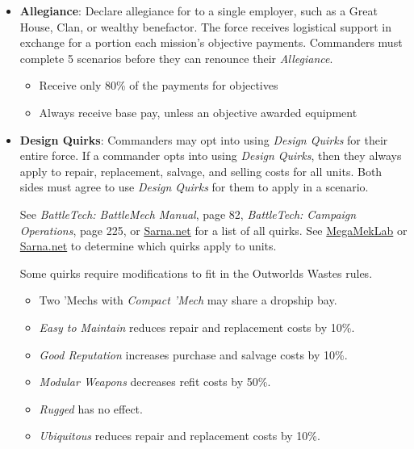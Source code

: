 \documentclass{article}
\begin{document}
\begin{itemize}
\item {\bfseries Allegiance}: Declare allegiance for to a single employer, such as a Great House, Clan, or wealthy benefactor.
The force receives logistical support in exchange for a portion each mission's objective payments.
Commanders must complete 5 scenarios before they can renounce their \emph{Allegiance}.

\begin{itemize}

\item Receive only 80\% of the payments for objectives

\item Always receive base pay, unless an objective awarded equipment

\end{itemize}

\item {\bfseries Design Quirks}: Commanders may opt into using \emph{Design Quirks} for their entire force.
If a commander opts into using \emph{Design Quirks}, then they always apply to repair, replacement, salvage, and selling costs for all units.
Both sides must agree to use \emph{Design Quirks} for them to apply in a scenario.

See \emph{BattleTech: BattleMech Manual}, page 82, \emph{BattleTech: Campaign Operations}, page 225, or \href{https://sarna.net}{Sarna.net} for a list of all quirks.
See \href{https://megamek.org}{MegaMekLab} or \href{https://sarna.net}{Sarna.net} to determine which quirks apply to units.

Some quirks require modifications to fit in the Outworlds Wastes rules.

\begin{itemize}

\item Two 'Mechs with \emph{Compact 'Mech} may share a dropship bay.

\item \emph{Easy to Maintain} reduces repair and replacement costs by 10\%.

\item \emph{Good Reputation} increases purchase and salvage costs by 10\%.

\item \emph{Modular Weapons} decreases refit costs by 50\%.

\item \emph{Rugged} has no effect.

\item \emph{Ubiquitous} reduces repair and replacement costs by 10\%.


\end{itemize}
\end{itemize}
\end{document}
